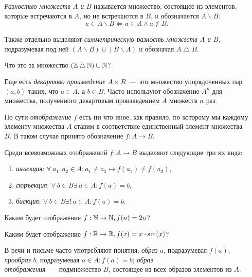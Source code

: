 	\emph{Разностью множеств $A$ и $B$} называется множество, состоящее из элементов, которые встречаются в $A$, но не встречаются в $B$, и обозначается $A \backslash B$:
	$$a \in A \backslash B \Leftrightarrow a \in A \wedge a \notin B.$$
	
	Также отдельно выделяют \emph{симметрическую разность множеств $A$ и $B$}, подразумевая под ней $(A \backslash B) \cup (B \backslash A)$ и обозначая $A \bigtriangleup B$.
	
\begin{testquestion}
	Что это за множество $(\mathbb{Z} \bigtriangleup \mathbb{N}) \cup \mathbb{N}$?
\end{testquestion}

	Еще есть \emph{декартово произведение $A \times B$}~---~это множество упорядоченных пар $(a, b)$ таких, что $a \in A$, а $b \in B$. Часто используют обозначение $A^n$ для множества, полученного декартовым произведением $A$ множеств $n$ раз.
	
	
	По сути \emph{отображение $f$} есть ни что иное, как правило, по которому мы каждому элементу множества $A$ ставим в соответствие единственный элемент множества $B$. В таком случае принято обозначение $f: A \to B$.
	
	Среди всевозможных отображений $f: A \to B$ выделяют следующие три их вида:

\begin{enumerate}
	\item \emph{инъекция}: $\forall \!\ a_1, a_2 \in A \colon a_1 \neq a_2 \mapsto f(a_1) \neq f(a_2)$,
	\item \emph{сюръекция}: $\forall \!\ b \in B \exists \!\ a \in A \colon f(a) = b$,
	\item \emph{биекция}: $\forall \!\ b \in B \exists! \!\ a \in A \colon f(a) = b$.
\end{enumerate}

\begin{testquestion}
	Каким будет отображение $f: \mathbb{N} \to \mathbb{N}, f(n) = 2n$?
\end{testquestion}

\begin{testquestion}
	Каким будет отображение $f: \mathbb{R} \to \mathbb{R}, f(x) = x \cdot \sin(x)$?
\end{testquestion}

	В речи и письме часто употребляют понятия: \emph{образ} $a$, подразумевая $f(a)$; \emph{прообраз} $b$, подразумевая $a \in A \colon f(a) = b$; \emph{образ отображения}~---~подмножество $B$, состоящее из всех образов элементов из $A$.